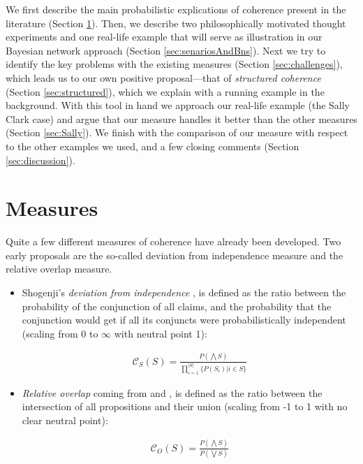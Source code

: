 \documentclass[10pt,]{scrartcl}
\begin{document}
We first describe the main probabilistic explications of coherence present in the literature (Section \ref{sec:measures}). Then, we describe two philosophically motivated thought experiments and one real-life example that will serve as illustration in our Bayesian network approach (Section \ref{sec:senariosAndBns}). Next we try to identify the key problems with  the existing measures (Section \ref{sec:challenges}), which leads us to our own positive proposal---that of \emph{structured coherence} (Section \ref{sec:structured}), which we explain with a running example in the background. With this tool in hand we approach our real-life example (the Sally Clark case) and argue that our measure handles it better than the other measures (Section \ref{sec:Sally}). We finish with the comparison of our measure with respect to the other examples we used, and a few closing comments (Section \ref{sec:discussion}). 





\section{Measures}\label{sec:measures}

Quite a few different measures of coherence have already been developed.  Two early proposals are the so-called deviation from independence measure and  the relative overlap measure.

\begin{itemize}
    \item  Shogenji's 
  \textit{deviation from independence} \citep{shogenji1999conducive}, is defined as the ratio between the probability of the
conjunction of all claims, and the probability that the conjunction
would get if all its conjuncts were probabilistically independent (scaling from 0 to $\infty$ with neutral point 1):

\begin{align}
    \tag{Shogenji}
    \label{coh:Shogenji}
     \mathcal{C}_{S}(S)=\frac{P(\bigwedge S)}{\prod_{i=1}^{\vert S \vert}\{P(S_i)\vert i \in S\}}
\end{align}

\item  \textit{Relative overlap} coming from \citep{olsson2001conducive} and \citep{glass2002}, is defined as the ratio  between the intersection of all propositions and their union (scaling from -1 to 1 with no clear neutral point):

\begin{align}
    \tag{Olsson}
    \label{coh:Olsson}
    \mathcal{C}_{O}(S)=\frac{P(\bigwedge S)}{P(\bigvee S)}
\end{align}


\end{itemize}
\end{document}
